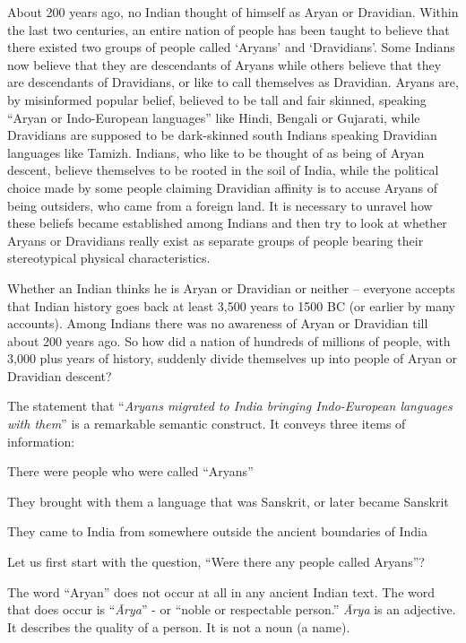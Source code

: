 About 200 years ago, no Indian thought of himself as Aryan or Dravidian. Within the last two centuries, an entire nation of people has been taught to believe that there existed two groups of people called ‘Aryans’ and ‘Dravidians’. Some Indians now believe that they are descendants of Aryans while others believe that they are descendants of Dravidians, or like to call themselves as Dravidian. Aryans are, by misinformed popular belief, believed to be tall and fair skinned, speaking “Aryan or Indo-European languages” like Hindi, Bengali or Gujarati, while Dravidians are supposed to be dark-skinned south Indians speaking Dravidian languages like Tamizh. Indians, who like to be thought of as being of Aryan descent, believe themselves to be rooted in the soil of India, while the political choice made by some people claiming Dravidian affinity is to accuse Aryans of being outsiders, who came from a foreign land. It is necessary to unravel how these beliefs became established among Indians and then try to look at whether Aryans or Dravidians really exist as separate groups of people bearing their stereotypical physical characteristics.

Whether an Indian thinks he is Aryan or Dravidian or neither – everyone accepts that Indian history goes back at least 3,500 years to 1500 BC (or earlier by many accounts). Among Indians there was no awareness of Aryan or Dravidian till about 200 years ago. So how did a nation of hundreds of millions of people, with 3,000 plus years of history, suddenly divide themselves up into people of Aryan or Dravidian descent?

The statement that “\textit{Aryans migrated to India bringing Indo-European languages with them}” is a remarkable semantic construct. It conveys three items of information:

\item There were people who were called “Aryans”

 \item They brought with them a language that was Sanskrit, or later became Sanskrit

 \item They came to India from somewhere outside the ancient boundaries of India

Let us first start with the question, “Were there any people called Aryans”?

The word “Aryan” does not occur at all in any ancient Indian text. The word that does occur is “\textit{Ārya}” - or “noble or respectable person.” \textit{Ārya} is an adjective. It describes the quality of a person. It is not a noun (a name).

